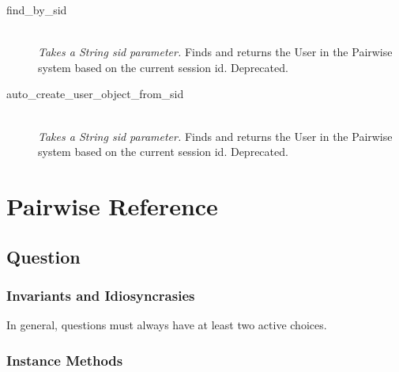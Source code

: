 \documentclass[11pt]{book}
\begin{document}
\begin{description}
	\item[find\_by\_sid]  \hfill \\
  \emph{Takes a String sid parameter.}  Finds and returns the User in the Pairwise system based on the current session id.  Deprecated.

	\item[auto\_create\_user\_object\_from\_sid]  \hfill \\
  \emph{Takes a String sid parameter.}  Finds and returns the User in the Pairwise system based on the current session id.  Deprecated.

\end{description}






\chapter{Pairwise Reference}

\section{Question}

\subsection{Invariants and Idiosyncrasies}

In general, questions must always have at least two active choices.

\subsection{Instance Methods}
\end{document}
